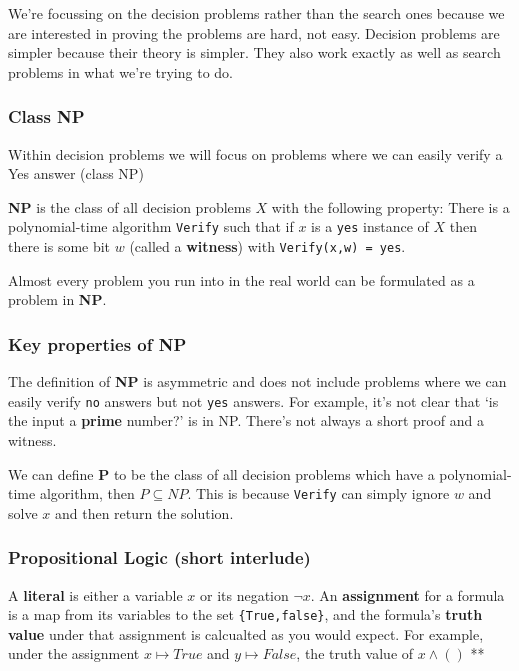 \documentclass[11pt,a4paper,titlepage,dvipsnames,cmyk]{scrartcl}
\begin{document}
We're focussing on the decision problems rather than the search ones
because we are interested in proving the problems are hard, not easy.
Decision problems are simpler because their theory is simpler. They also
work exactly as well as search problems in what we're trying to do.

\subsubsection{Class NP}%
\label{ssub:class-np}
Within decision problems we will focus on problems where we can easily
verify a Yes answer (class NP)

\textbf{NP} is the class of all decision problems $X$ with the following
property: There is a polynomial-time algorithm \texttt{Verify} such that
if $x$ is a \texttt{yes} instance of $X$ then there is some bit $w$ (called
a \textbf{witness}) with \texttt{Verify(x,w) = yes}.

Almost every problem you run into in the real world can be formulated as a
problem in \textbf{NP}.

\subsubsection{Key properties of NP}%
\label{ssub:key-props-np}
The definition of \textbf{NP} is asymmetric and does not include problems
where we can easily verify \texttt{no} answers but not \texttt{yes}
answers. For example, it's not clear that `is the input a \textbf{prime}
number?' is in NP. There's not always a short proof and a witness.

We can define \textbf{P} to be the class of all decision problems which
have a polynomial-time algorithm, then $P \subseteq NP$. This is because
\texttt{Verify} can simply ignore $w$ and solve $x$ and then return the
solution.

\subsubsection{Propositional Logic (short interlude)}%
\label{Prop-logic}
A \textbf{literal} is either a variable $x$ or its negation $\neg x$. An
\textbf{assignment} for a formula is a map from its variables to the set
\texttt{\{True,false\}}, and the formula's \textbf{truth value} under that
assignment is calcualted as you would expect. For example, under the
assignment $x \mapsto True$ and $y \mapsto False$, the truth value of $x
\wedge ()$ ** %
\end{document}
